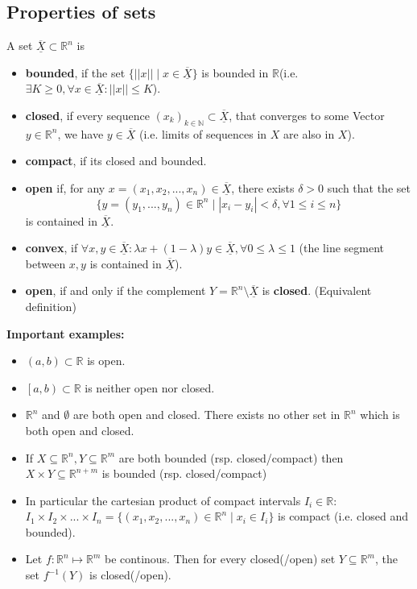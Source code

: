 \documentclass[a4paper,fontsize = 10pt]{article}
\def\R{\mathbb{R}}
\def\N{\mathbb{N}}
\def\X{\underline{\overline{X}}}
\begin{document}
\subsection{Properties of sets}
A set \(\X \subset \R^n \) is
\begin{itemize}
  \item \textbf{bounded}, if the set \(\{ ||x|| \mid x \in \X \}\) is bounded in \(\R\)(i.e. \(\exists K \ge 0, \forall x \in \X: ||x|| \le K\)).
  \item \textbf{closed}, if every sequence \((x_k)_{k\in \N} \subset \X\), that converges to some Vector \(y \in \R^n\), we have \(y \in \X\) (i.e. limits of sequences in $X$ are also in $X$).
  \item \textbf{compact}, if its closed and bounded.
  \item \textbf{open} if, for any $x =(x_1,x_2,...,x_n) \in \X$, there exists $\delta >0$ such that the set \[\{y = (y_1,...,y_n) \in \R^n \mid |x_i-y_i|< \delta, \forall 1 \leq i \leq n\}\] is contained in $\X$.
  \item \textbf{convex}, if \(\forall x, y \in \X: \lambda x + (1 - \lambda)y \in \X, \forall 0 \leq \lambda \leq 1\) (the line segment between \(x, y\) is contained in \(\X\)).
  \item \textbf{open}, if and only if the complement $Y = \R^n \setminus \X$ is \textbf{closed}. (Equivalent definition)
\end{itemize}
\textbf{Important examples:}
\begin{itemize}
  \item \((a,b) \subset \R\) is open.
  \item \(\left[a,b\right) \subset \R\) is neither open nor closed.
  \item \(\R^n\) and \(\emptyset\) are both open and closed. There exists no other set in $\R^n$ which is both open and closed.
  \item If $X \subseteq \R^n, Y \subseteq \R^m$ are both bounded (rsp. closed/compact) then $X \times Y \subseteq \R^{n+m}$ is bounded (rsp. closed/compact)
  \item In particular the cartesian product of compact intervals $I_i \in \R$: $I_1 \times I_2 \times ... \times I_n = \{(x_1,x_2,...,x_n) \in \R^n \mid x_i \in I_i\}$ is compact (i.e. closed and bounded).
  \item Let $f: \R^n \mapsto \R^m$ be continous. Then for every closed(/open) set $Y \subseteq \R^m$, the set $f^{-1}(Y)$ is closed(/open). 
\end{itemize}
\end{document}
